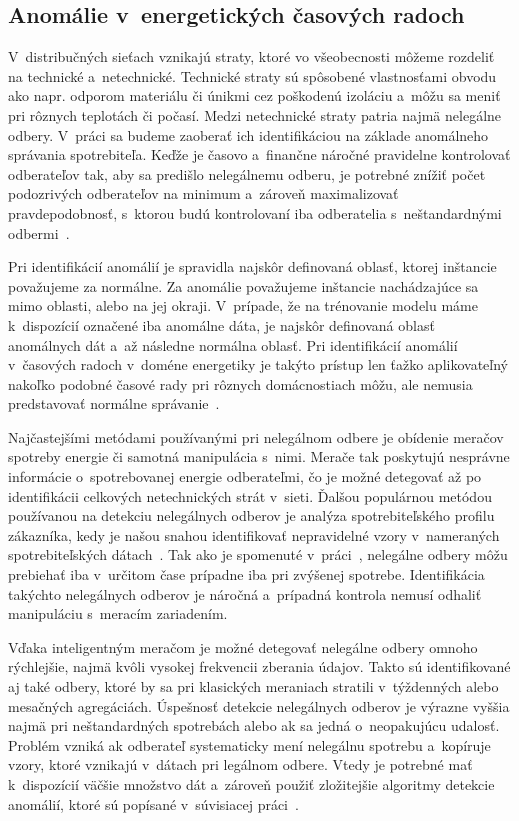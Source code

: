 \documentclass[a4paper,twoside,slovak,12pt,appendix]{article}
\begin{document}
\subsection{Anomálie v~energetických časových radoch}
V~distribučných sieťach vznikajú straty, ktoré vo všeobecnosti môžeme rozdeliť
na technické a~netechnické. Technické straty sú spôsobené vlastnosťami
obvodu ako napr. odporom materiálu či únikmi cez poškodenú izoláciu a~môžu sa
meniť pri rôznych teplotách či počasí. Medzi netechnické straty patria najmä
nelegálne odbery. V~práci sa budeme zaoberať ich identifikáciou na základe
anomálneho správania spotrebiteľa. Keďže je časovo a~finančne náročné
pravidelne kontrolovať odberateľov tak, aby sa predišlo nelegálnemu odberu,
je potrebné znížiť počet podozrivých odberateľov na minimum a~zároveň
maximalizovať pravdepodobnosť, s~ktorou budú kontrolovaní iba odberatelia
s~neštandardnými odbermi~\cite{Coma-Puig2016,Sahoo2015}.

Pri identifikácií anomálií je spravidla najskôr definovaná oblasť, ktorej
inštancie považujeme za normálne. Za anomálie považujeme inštancie nachádzajúce
sa mimo oblasti, alebo na jej okraji. V~prípade, že na trénovanie modelu máme
k~dispozícií označené iba anomálne dáta, je najskôr definovaná oblasť anomálnych
dát a~až následne normálna oblasť. Pri identifikácií anomálií v~časových radoch
v~doméne energetiky je takýto prístup len ťažko aplikovateľný nakoľko podobné
časové rady pri rôznych domácnostiach môžu, ale nemusia predstavovať normálne
správanie~\cite{Spiric2015}.

Najčastejšími metódami používanými pri nelegálnom odbere je obídenie meračov
spotreby energie či samotná manipulácia s~nimi. Merače tak poskytujú nesprávne
informácie o~spotrebovanej energie odberateľmi, čo je možné detegovať až po
identifikácii celkových netechnických strát v~sieti. Ďalšou populárnou metódou
používanou na detekciu nelegálnych odberov je analýza spotrebiteľského
profilu zákazníka, kedy je našou snahou identifikovať nepravidelné vzory
v~nameraných spotrebiteľských dátach~\cite{Sahoo2015}. Tak ako je spomenuté
v~práci~\cite{Depuru2012}, nelegálne odbery môžu prebiehať iba v~určitom čase
prípadne iba pri zvýšenej spotrebe. Identifikácia takýchto nelegálnych odberov
je náročná a~prípadná kontrola nemusí odhaliť manipuláciu s~meracím zariadením.

Vďaka inteligentným meračom je možné detegovať nelegálne odbery omnoho
rýchlejšie, najmä kvôli vysokej frekvencii zberania údajov. Takto sú
identifikované aj také odbery, ktoré by sa pri klasických meraniach stratili
v~týždenných alebo mesačných agregáciách. Úspešnosť detekcie nelegálnych odberov
je výrazne vyššia najmä pri neštandardných spotrebách alebo ak sa jedná
o~neopakujúcu udalosť. Problém vzniká ak odberateľ systematicky mení
nelegálnu spotrebu a~kopíruje vzory, ktoré vznikajú v~dátach pri legálnom
odbere. Vtedy je potrebné mať k~dispozícií väčšie množstvo dát a~zároveň použiť
zložitejšie algoritmy detekcie anomálií, ktoré sú popísané v~súvisiacej
práci~\cite{Nikovski2013}.
\end{document}
